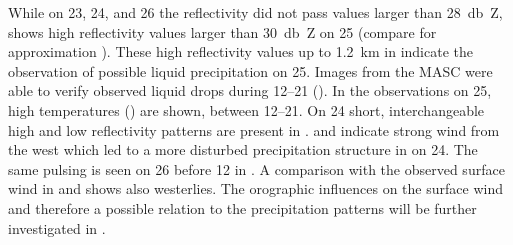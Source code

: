 While on \num{23}, \num{24}, and \SI{26}{\dec} the reflectivity did not pass values larger than \SI{28}{\decibel Z},  shows high reflectivity values larger than \SI{30}{\decibel Z} on \SI{25}{\dec} (compare for approximation ). 
These high reflectivity values up to \SI{1.2}{\km} in  indicate the observation of possible liquid precipitation on \SI{25}{\dec}. Images from the MASC were able to verify observed liquid drops during \SIrange{12}{21}{\UTC} (). 
In the observations on \SI{25}{\dec}, %
high temperatures () %
are shown, between \SIrange{12}{21}{\UTC}. %
On \SI{24}{\dec} short, interchangeable high and low reflectivity patterns are present in .  and  indicate strong wind from the west which led to a more disturbed precipitation structure in  on \SI{24}{\dec}. 
The same pulsing is seen on \SI{26}{\dec} before \SI{12}{\UTC} in . A comparison with the observed surface wind in  and  shows also westerlies.  The orographic influences on the surface wind and therefore a possible relation to the precipitation patterns will be further investigated in . 
\\
\\

